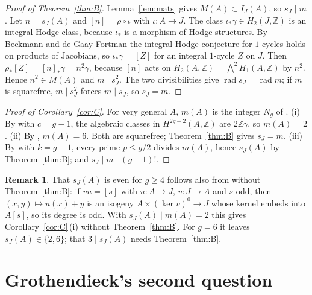 \documentclass[11pt,a4paper]{article}
\theoremstyle{definition}
\newtheorem{remark}[lemma]{Remark}
\newcommand{\Z}{\mathbb{Z}}
\renewcommand{\IJ}{I_J}
\newcommand{\sJ}{s_J}
\newcommand{\rad}{\operatorname{rad}}
\begin{document}
\begin{proof}[Proof of Theorem~\ref{thm:B}]
Lemma~\ref{lem:mats} gives $M(A)\subset\IJ(A)$, so $\sJ\mid m$. Let
$n=\sJ(A)$ and $[n]=\rho\circ\iota$ with $\iota\colon A\to J$. The class
$\iota_*\gamma\in H_2(J,\Z)$ is an integral Hodge class, because $\iota_*$ is
a morphism of Hodge structures. By Beckmann and de Gaay Fortman
\cite[Thm.~1.2]{BdGF} the integral Hodge conjecture for $1$-cycles holds on
products of Jacobians, so $\iota_*\gamma=[Z]$ for an integral $1$-cycle $Z$
on $J$. Then $\rho_*[Z]=[n]_*\gamma=n^2\gamma$, because $[n]$ acts on
$H_2(A,\Z)=\bigwedge^2H_1(A,\Z)$ by $n^2$. Hence $n^2\in M(A)$ and
$m\mid\sJ^2$. The two divisibilities give $\rad\sJ=\rad m$; if $m$ is
squarefree, $m\mid\sJ^2$ forces $m\mid\sJ$, so $\sJ=m$.
\end{proof}

\begin{proof}[Proof of Corollary~\ref{cor:C}]
For very general $A$, $m(A)$ is the integer $N_g$ of
\cite[Question~1.1]{EGFS2}. (i) By \cite[Cor.~1.2]{EGFS} with $c=g-1$, the
algebraic classes in $H^{2g-2}(A,\Z)$ are $2\Z\gamma$, so $m(A)=2$. (ii)
By \cite[Thm.~1.2]{EGFS2}, $m(A)=6$. Both are squarefree;
Theorem~\ref{thm:B} gives $\sJ=m$. (iii) By \cite[Thm.~1.1 and
Cor.~1.2]{ES} with $k=g-1$, every prime $p\le g/2$ divides $m(A)$, hence
$\sJ(A)$ by Theorem~\ref{thm:B}; and $\sJ\mid m\mid(g-1)!$.
\end{proof}

\begin{remark}\label{rem:even}
That $\sJ(A)$ is even for $g\ge4$ follows also from \cite[Cor.~1.5]{EGFS}
without Theorem~\ref{thm:B}: if $vu=[s]$ with $u\colon A\to J$, $v\colon
J\to A$ and $s$ odd, then $(x,y)\mapsto u(x)+y$ is an isogeny
$A\times(\ker v)^0\to J$ whose kernel embeds into $A[s]$, so its degree is
odd. With $\sJ(A)\mid m(A)=2$ \cite[Cor.~1.2]{EGFS} this gives
Corollary~\ref{cor:C}\,(i) without Theorem~\ref{thm:B}. For $g=6$ it leaves
$\sJ(A)\in\{2,6\}$; that $3\mid\sJ(A)$ needs Theorem~\ref{thm:B}.
\end{remark}

\section{Grothendieck's second question}\label{sec:D}
\end{document}
